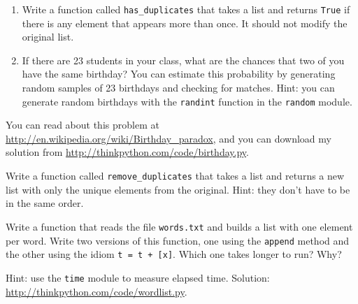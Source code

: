 \documentclass[10pt]{book}
\begin{document}
\begin{CJK}{UTF8}{gbsn}
\begin{exercise}
\begin{enumerate}

\item Write a function called \verb"has_duplicates" that takes
a list and returns {\tt True} if there is any element that
appears more than once.  It should not modify the original
list.

\item If there are 23 students in your class, what are the chances
that two of you have the same birthday?  You can estimate this
probability by generating random samples of 23 birthdays
and checking for matches.  Hint: you can generate random birthdays
with the {\tt randint} function in the {\tt random} module.

\end{enumerate}

You can read about this problem at
\url{http://en.wikipedia.org/wiki/Birthday_paradox}, and you can download my
solution from \url{http://thinkpython.com/code/birthday.py}.

\end{exercise}


\begin{exercise}

Write a function called \verb"remove_duplicates" that takes
a list and returns a new list with only the unique elements from
the original.  Hint: they don't have to be in the same order.
\end{exercise}


\begin{exercise}

Write a function that reads the file {\tt words.txt} and builds
a list with one element per word.  Write two versions of
this function, one using the {\tt append} method and the
other using the idiom {\tt t = t + [x]}.  Which one takes
longer to run?  Why?

Hint: use the {\tt time} module to measure elapsed time.
Solution: \url{http://thinkpython.com/code/wordlist.py}.

\end{exercise}


\begin{exercise}
\label{wordlist1}
\label{bisection}


\end{exercise}
\end{CJK}
\end{document}
